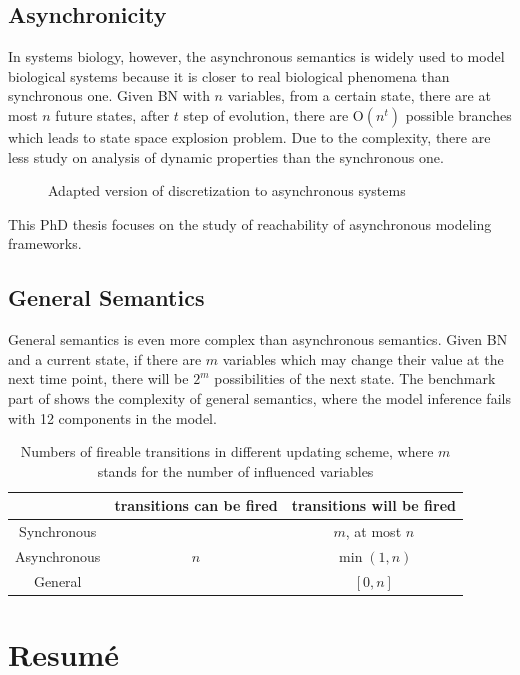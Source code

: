 \subsection{Asynchronicity}
In systems biology, however, the asynchronous semantics is widely used to model biological systems because it is closer to real biological phenomena than synchronous one.
Given BN with $n$ variables, from a certain state, there are at most $n$ future states, after $t$ step of evolution, there are O$(n^t)$ possible branches which leads to state space explosion problem.
Due to the complexity, there are less study on analysis of dynamic properties than the synchronous one.
\begin{figure}
    \centering
    
    \caption[Discretization]{Adapted version of discretization to asynchronous systems}
    \label{fig:my_label}
\end{figure}

This PhD thesis focuses on the study of reachability of asynchronous modeling frameworks.
\subsection{General Semantics}
General semantics is even more complex than asynchronous semantics.
Given BN and a current state, if there are $m$ variables which may change their value at the next time point, there will be $2^m$ possibilities of the next state.
The benchmark part of \cite{ribeiro2018learning} shows the complexity of general semantics, where the model inference fails with 12 components in the model. 
\begin{table}[ht]
    \centering
    \begin{tabular}{c|c|c}
            &transitions can be fired&transitions will be fired\\
            \hline
         Synchronous & \multirow{3}{*}{$n$} & $m$, at most $n$\\\cline{1-1} \cline{3-3}
            
         Asynchronous & & $\min(1,n)$\\ \cline{1-1} \cline{3-3}
            
         General &  & $[0,n]$
    \end{tabular}
    \caption[Update schemes]{Numbers of fireable transitions in different updating scheme, where $m$ stands for the number of influenced variables}
    \label{tab:semantics}
\end{table}

\section{Resum\'e}